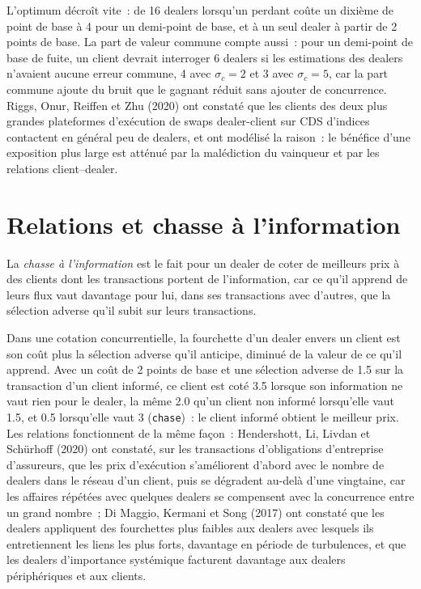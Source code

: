 L'optimum décroît vite~: de 16 dealers lorsqu'un perdant coûte un dixième de point de base à 4 pour un demi-point de base, et à un seul dealer à partir de 2
points de base. La part de valeur commune compte aussi~: pour un demi-point de base de fuite, un client devrait interroger 6 dealers si les estimations des dealers n'avaient aucune
erreur commune, 4 avec $\sigma_c=2$ et 3 avec $\sigma_c=5$, car la part commune ajoute du bruit que le gagnant réduit sans ajouter de concurrence.
Riggs, Onur, Reiffen et Zhu (2020) ont constaté que les clients des deux plus grandes plateformes d'exécution de swaps dealer-client sur CDS d'indices contactent
en général peu de dealers, et ont modélisé la raison~: le bénéfice d'une exposition plus large est atténué par la malédiction du vainqueur et par les relations client--dealer.

\section{Relations et chasse à l'information}

\begin{definition}\label{def:mx:request-for-quote-and-dealer-markets-in-theory:chasing}
La \emph{chasse à l'information} est le fait pour un dealer de coter de meilleurs prix à des clients dont les transactions portent de l'information, car
ce qu'il apprend de leurs flux vaut davantage pour lui, dans ses transactions avec d'autres, que la sélection adverse qu'il subit sur leurs transactions.
\end{definition}

Dans une cotation concurrentielle, la fourchette d'un dealer envers un client est son coût plus la sélection adverse qu'il anticipe, diminué de la valeur de ce qu'il apprend. Avec un
coût de 2 points de base et une sélection adverse de 1.5 sur la transaction d'un client informé, ce client est coté 3.5 lorsque son information
ne vaut rien pour le dealer, la même 2.0 qu'un client non informé lorsqu'elle vaut 1.5, et 0.5 lorsqu'elle vaut 3 (\texttt{chase})~: le client informé
obtient le meilleur prix. Les relations fonctionnent de la même façon~: Hendershott, Li, Livdan et Schürhoff (2020) ont constaté, sur les transactions d'obligations d'entreprise d'assureurs, que
les prix d'exécution s'améliorent d'abord avec le nombre de dealers dans le réseau d'un client, puis se dégradent au-delà d'une vingtaine, car les affaires répétées avec quelques dealers se compensent
avec la concurrence entre un grand nombre~; Di Maggio, Kermani et Song (2017) ont constaté que les dealers appliquent des fourchettes plus faibles aux dealers avec lesquels ils entretiennent les liens les plus forts, davantage en période de turbulences, et que
les dealers d'importance systémique facturent davantage aux dealers périphériques et aux clients.

